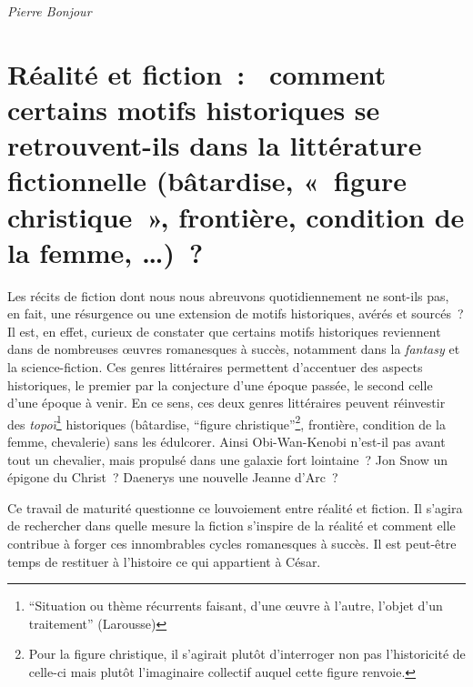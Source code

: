 \documentclass[
  10pt,
  french,
  a5paper,
  openany]{book}
\newenvironment{signature}{\begin{flushright}}{\end{flushright}}
\begin{document}
\begin{signature}
\emph{Pierre Bonjour}

\end{signature}

\hypertarget{ruxe9alituxe9-et-fiction-comment-certains-motifs-historiques-se-retrouvent-ils-dans-la-littuxe9rature-fictionnelle-buxe2tardise-figure-christique-frontiuxe8re-condition-de-la-femme}{%
\chapter{\texorpdfstring{Réalité et fiction~: \linebreak~comment certains motifs historiques se retrouvent-ils dans la littérature fictionnelle (bâtardise, «~figure christique~», frontière, condition de la femme, \ldots)~?}{Réalité et fiction~: ~comment certains motifs historiques se retrouvent-ils dans la littérature fictionnelle (bâtardise, «~figure christique~», frontière, condition de la femme, \ldots)~?}}\label{ruxe9alituxe9-et-fiction-comment-certains-motifs-historiques-se-retrouvent-ils-dans-la-littuxe9rature-fictionnelle-buxe2tardise-figure-christique-frontiuxe8re-condition-de-la-femme}}

Les récits de fiction dont nous nous abreuvons quotidiennement ne sont-ils pas, en fait, une résurgence ou une extension de motifs historiques, avérés et sourcés~? Il est, en effet, curieux de constater que certains motifs historiques reviennent dans de nombreuses œuvres romanesques à succès, notamment dans la \emph{fantasy} et la science-fiction. Ces genres littéraires permettent d'accentuer des aspects historiques, le premier par la conjecture d'une époque passée, le second celle d'une époque à venir. En ce sens, ces deux genres littéraires peuvent réinvestir des \emph{topoï}\footnote{``Situation ou thème récurrents faisant, d'une œuvre à l'autre, l'objet d'un traitement'' (Larousse) } historiques (bâtardise, ``figure christique''\footnote{Pour la figure christique, il s'agirait plutôt d'interroger non pas l'historicité de celle-ci mais plutôt l'imaginaire collectif auquel cette figure renvoie.}, frontière, condition de la femme, chevalerie) sans les édulcorer. Ainsi Obi-Wan-Kenobi n'est-il pas avant tout un chevalier, mais propulsé dans une galaxie fort lointaine~? Jon Snow un épigone du Christ~? Daenerys une nouvelle Jeanne d'Arc~?

Ce travail de maturité questionne ce louvoiement entre réalité et fiction. Il s'agira de rechercher dans quelle mesure la fiction s'inspire de la réalité et comment elle contribue à forger ces innombrables cycles romanesques à succès. Il est peut-être temps de restituer à l'histoire ce qui appartient à César.
\end{document}
